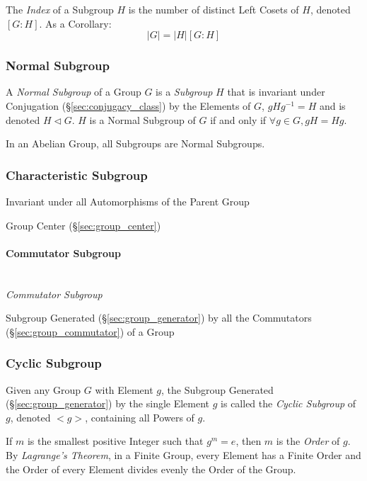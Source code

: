 The \emph{Index} of a Subgroup $H$ is the number of distinct Left
Cosets of $H$, denoted $[G:H]$. As a Corollary:
\[
    |G| = |H|[G:H]
\]



\subsubsection{Normal Subgroup}\label{sec:normal_subgroup}

A \emph{Normal Subgroup} of a Group $G$ is a \emph{Subgroup} $H$ that
is invariant under Conjugation (\S\ref{sec:conjugacy_class}) by the
Elements of $G$, $gHg^{-1} = H$ and is denoted $H \triangleleft G$.
$H$ is a Normal Subgroup of $G$ if and only if $\forall g \in G, gH =
Hg$.

In an Abelian Group, all Subgroups are Normal Subgroups.



\subsubsection{Characteristic Subgroup}
\label{sec:characteristic_subgroup}

Invariant under all Automorphisms of the Parent Group

Group Center (\S\ref{sec:group_center})



\paragraph{Commutator Subgroup}\label{sec:commutator_subgroup}
\hfill \\

\emph{Commutator Subgroup}

Subgroup Generated (\S\ref{sec:group_generator}) by all the
Commutators (\S\ref{sec:group_commutator}) of a Group



\subsubsection{Cyclic Subgroup}\label{sec:cyclic_subgroup}

Given any Group $G$ with Element $g$, the Subgroup Generated
(\S\ref{sec:group_generator}) by the single Element $g$ is called the
\emph{Cyclic Subgroup} of $g$, denoted $<g>$, containing all Powers of
$g$.

If $m$ is the smallest positive Integer such that $g^m = e$, then $m$
is the \emph{Order} of $g$. By \emph{Lagrange's Theorem}, in a Finite
Group, every Element has a Finite Order and the Order of every Element
divides evenly the Order of the Group.



